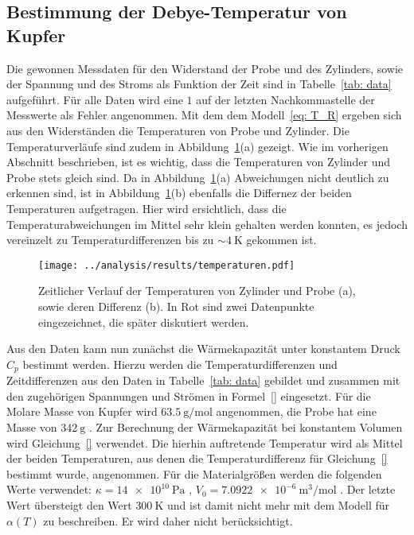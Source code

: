\subsection{Bestimmung der Debye-Temperatur von Kupfer}
Die gewonnen Messdaten für den Widerstand der Probe und des Zylinders, sowie der Spannung und des Stroms
als Funktion der Zeit sind in Tabelle~\ref{tab: data} aufgeführt. Für alle Daten wird eine $1$ auf der letzten
Nachkommastelle der Messwerte als Fehler angenommen. 
Mit dem dem Modell~\eqref{eq: T_R} ergeben sich aus den Widerständen die Temperaturen von Probe und Zylinder.
Die Temperaturverläufe sind zudem in Abbildung~\ref{fig: temp}(a) gezeigt. Wie im vorherigen Abschnitt beschrieben, ist es 
wichtig, dass die Temperaturen von Zylinder und Probe stets gleich sind. Da in Abbildung~\ref{fig: temp}(a) Abweichungen nicht 
deutlich zu erkennen sind, ist in Abbildung~\ref{fig: temp}(b) ebenfalls die Differnez der beiden Temperaturen 
aufgetragen. Hier wird ersichtlich, dass die Temperaturabweichungen im Mittel sehr klein gehalten werden konnten, es
jedoch vereinzelt zu Temperaturdifferenzen bis zu $\sim\!\SI{4}{\kelvin}$ gekommen ist.
\begin{figure}
\centering
\texttt{[image: ../analysis/results/temperaturen.pdf]}
\caption{Zeitlicher Verlauf der Temperaturen von Zylinder und Probe (a), sowie deren Differenz (b). In Rot sind 
        zwei Datenpunkte eingezeichnet, die später diskutiert werden.}
\label{fig: temp}
\end{figure}



Aus den Daten kann nun zunächst die Wärmekapazität unter konstantem Druck $C_p$ bestimmt werden. Hierzu werden 
die Temperaturdifferenzen und Zeitdifferenzen aus den Daten in Tabelle~\ref{tab: data} gebildet und zusammen mit den 
zugehörigen Spannungen und Strömen in Formel~\eqref{} eingesetzt. Für die Molare Masse von Kupfer 
wird $\SI{63.5}{\gram / \mol}$ \cite{molarmass} angenommen, die Probe hat eine Masse von $\SI{342}{\gram}$ \cite{anleitung47}. 
Zur Berechnung der Wärmekapazität
bei konstantem Volumen wird Gleichung~\eqref{} verwendet. Die hierhin auftretende Temperatur wird als Mittel 
der beiden Temperaturen, aus denen die Temperaturdifferenz für Gleichung~\eqref{} bestimmt wurde, angenommen. 
Für die Materialgrößen werden die folgenden Werte verwendet: $\kappa = \SI{14e10}{\pascal}$ \cite{gross}, $V_0 = \SI{7.0922e-6}{\meter^3 / \mol}$ \cite{volume}.
Der letzte Wert übersteigt den Wert $\SI{300}{\kelvin}$ und ist damit nicht mehr mit dem Modell für $\alpha(T)$
zu beschreiben. Er wird daher nicht berücksichtigt.


